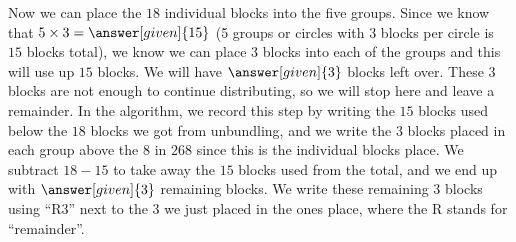 \documentclass{ximera}
\begin{document}
\begin{example}
Now we can place the $18$ individual blocks into the five groups. Since we know that $5 \times 3 = \answer[given]{15}$ (5 groups or circles with $3$ blocks per circle is $15$ blocks total), we know we can place $3$ blocks into each of the groups and this will use up $15$ blocks. We will have $\answer[given]{3}$ blocks left over. These $3$ blocks are not enough to continue distributing, so we will stop here and leave a remainder. In the algorithm, we record this step by writing the $15$ blocks used below the $18$ blocks we got from unbundling, and we write the $3$ blocks placed in each group above the $8$ in $268$ since this is the individual blocks place. We subtract $18-15$ to take away the $15$ blocks used from the total, and we end up with $\answer[given]{3}$ remaining blocks. We write these remaining $3$ blocks using ``R$3$'' next to the $3$ we just placed in the ones place, where the R stands for ``remainder''.

\begin{image}
\end{image}

\begin{image}
\begin{tikzpicture}



\end{tikzpicture}
\end{image}
\end{example}
\end{document}
